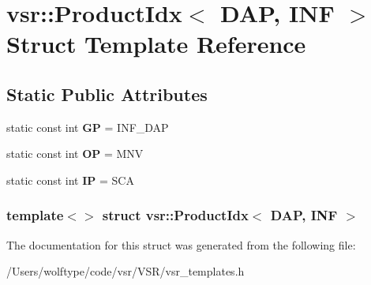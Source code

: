 \hypertarget{structvsr_1_1_product_idx_3_01_d_a_p_00_01_i_n_f_01_4}{\section{vsr\-:\-:Product\-Idx$<$ D\-A\-P, I\-N\-F $>$ Struct Template Reference}
\label{structvsr_1_1_product_idx_3_01_d_a_p_00_01_i_n_f_01_4}
}
\subsection*{Static Public Attributes}
\begin{DoxyCompactItemize}
\item 
\hypertarget{structvsr_1_1_product_idx_3_01_d_a_p_00_01_i_n_f_01_4_a0b30343087ab7ac03deb473ba093812b}{static const int {\bfseries G\-P} = I\-N\-F\-\_\-\-D\-A\-P}\label{structvsr_1_1_product_idx_3_01_d_a_p_00_01_i_n_f_01_4_a0b30343087ab7ac03deb473ba093812b}

\item 
\hypertarget{structvsr_1_1_product_idx_3_01_d_a_p_00_01_i_n_f_01_4_a3c5f2fc636848375a7ac3c3f0d7d9da0}{static const int {\bfseries O\-P} = M\-N\-V}\label{structvsr_1_1_product_idx_3_01_d_a_p_00_01_i_n_f_01_4_a3c5f2fc636848375a7ac3c3f0d7d9da0}

\item 
\hypertarget{structvsr_1_1_product_idx_3_01_d_a_p_00_01_i_n_f_01_4_a07b8b47d7b3b9ed850dd2b80ee62b415}{static const int {\bfseries I\-P} = S\-C\-A}\label{structvsr_1_1_product_idx_3_01_d_a_p_00_01_i_n_f_01_4_a07b8b47d7b3b9ed850dd2b80ee62b415}

\end{DoxyCompactItemize}
\subsubsection*{template$<$$>$ struct vsr\-::\-Product\-Idx$<$ D\-A\-P, I\-N\-F $>$}



The documentation for this struct was generated from the following file\-:\begin{DoxyCompactItemize}
\item 
/\-Users/wolftype/code/vsr/\-V\-S\-R/vsr\-\_\-templates.\-h\end{DoxyCompactItemize}

